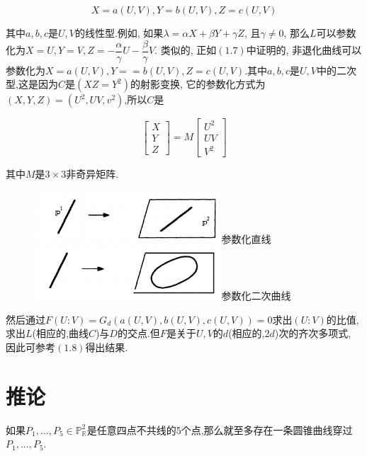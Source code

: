 \documentclass[UTF8]{book}
\begin{document}
		\begin{equation*}
			X=a(U,V), Y=b(U,V), Z=c(U,V)
		\end{equation*}
	
		其中$ a,b,c $是$ U,V $的线性型.例如, 如果$\lambda=\alpha X+\beta Y+\gamma Z$, 且$\gamma \neq 0$, 那么$ L $可以参数化为$ X=U,Y=V, Z=-\dfrac{\alpha}{\gamma}U-\dfrac{\beta}{\gamma}V$. 类似的, 正如$ (1.7) $中证明的, 非退化曲线可以参数化为$ X=a(U,V), Y==b(U,V),Z=c(U,V) $.其中$ a,b,c $是$ U,V $中的二次型,这是因为$ C $是$(XZ=Y^{2})$的射影变换, 它的参数化方式为$ (X,Y,Z)=(U^{2},UV,v^{2})$,所以$ C $是
		
		\begin{equation*}
		 \begin{bmatrix} X \\Y\\ Z\end{bmatrix}=M\begin{bmatrix} U^{2} \\UV\\ V^{2}\end{bmatrix}
		\end{equation*}
	
		其中$ M $是$ 3\times3 $非奇异矩阵.
	
		\begin{figure}[H]
		  \centering
		  \includegraphics[width=7cm]{1811.jpg}参数化直线\\
		  \includegraphics[width=7cm]{1822.jpg}参数化二次曲线\\
		\end{figure}
	
		然后通过$F(U:V)=G_{d}(a(U,V),b(U,V),c(U,V))=0$求出$ (U:V) $的比值, 求出$ L $(相应的,曲线$ C $)与$ D $的交点.但$ F $是关于$ U,V $的$ d $(相应的,$ 2d $)次的齐次多项式, 因此可参考$ (1.8) $得出结果.

	\section{推论}
		如果$P_{1},...,P_{5} \in \mathbb{P}^{2}_{\mathbb{R}}$是任意四点不共线的5个点,那么就至多存在一条圆锥曲线穿过$P_{1},...,P_{5}$.
		
\end{document}

